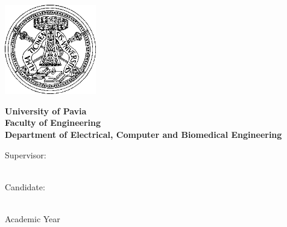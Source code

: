\frenchspacing
\frontmatter


\begin{titlepage}

\thispagestyle{empty}
\begin{center}
	\vskip 1cm
	\includegraphics[width=4cm]{figs/Logo-unipv-bw}
	\vskip 0.5cm
	
	\LARGE
		\textbf{University of Pavia}\\
		\textbf{Faculty of Engineering}\\
		\textbf{Department of Electrical, Computer and Biomedical Engineering}
		\vskip 0.5cm
	\Large
		\printgraduation
	
	\vskip 1.5cm
	\Huge
		\textbf{\printtitle}
	\vskip 1.5cm
	
	\Large
		\begin{minipage}[t]{7cm}
			Supervisor:\\
			\printsupervisor \\


		\end{minipage}
		\hfill
		\begin{minipage}[t]{5cm}
			Candidate:\\
			\printauthor\\
		\end{minipage}
		
		\vskip 1.5cm
		Academic Year \printacademicyear
\end{center}

\vfill
\eject
\end{titlepage}
